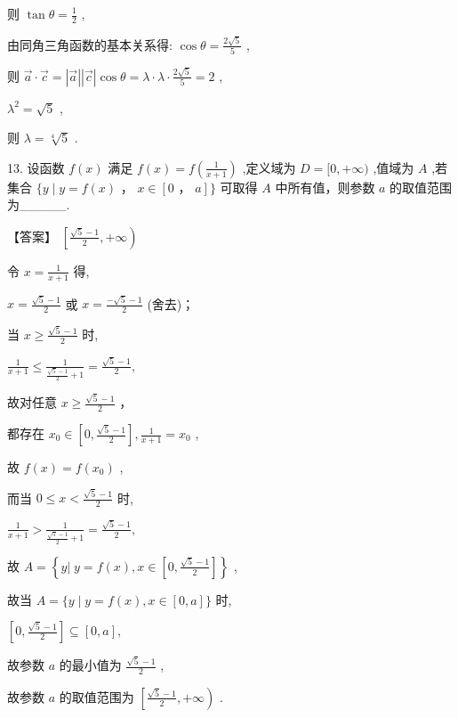 \documentclass[10pt]{article}
\begin{document}
则 \(\tan \theta  = \frac{1}{2}\) ,

由同角三角函数的基本关系得: \(\cos \theta  = \frac{2\sqrt{5}}{5}\) ,

则 \(\overrightarrow{a} \cdot  \overrightarrow{c} = \left| \overrightarrow{a}\right| \left| \overrightarrow{c}\right| \cos \theta  = \lambda  \cdot  \lambda  \cdot  \frac{2\sqrt{5}}{5} = 2\) ,

\({\lambda }^{2} = \sqrt{5}\) ,

则 \(\lambda  = \sqrt[4]{5}\) .

13. 设函数 \(f\left( x\right)\) 满足 \(f\left( x\right)  = f\left( \frac{1}{x + 1}\right)\) ,定义域为 \(D = \lbrack 0, + \infty )\) ,值域为 \(A\) ,若集合 \(\{ y \mid  y = f\left( x\right) \text{ ， }x \in  \left\lbrack  {0\text{ ， }a}\right\rbrack  \}\) 可取得 \(A\) 中所有值，则参数 \(a\) 的取值范围为\_\_\_\_\_.

【答案】 \(\left\lbrack  {\frac{\sqrt{5} - 1}{2}, + \infty }\right)\)

令 \(x = \frac{1}{x + 1}\) 得,

\(x = \frac{\sqrt{5} - 1}{2}\) 或 \(x = \frac{-\sqrt{5} - 1}{2}\) (舍去)；

当 \(x \geq  \frac{\sqrt{5} - 1}{2}\) 时,

\(\frac{1}{x + 1} \leq  \frac{1}{\frac{\sqrt{5} - 1}{2} + 1} = \frac{\sqrt{5} - 1}{2},\)

故对任意 \(x \geq  \frac{\sqrt{5} - 1}{2}\) ，

都存在 \({x}_{0} \in  \left\lbrack  {0,\frac{\sqrt{5} - 1}{2}}\right\rbrack  ,\frac{1}{x + 1} = {x}_{0}\) ,

故 \(f\left( x\right)  = f\left( {x}_{0}\right)\) ,

而当 \(0 \leq  x < \frac{\sqrt{5} - 1}{2}\) 时,

\(\frac{1}{x + 1} > \frac{1}{\frac{\sqrt{5} - 1}{2} + 1} = \frac{\sqrt{5} - 1}{2},\)

故 \(A = \left\{  {y\left| {\;y = f\left( x\right) }\right. ,x \in  \left\lbrack  {0,\frac{\sqrt{5} - 1}{2}}\right\rbrack  }\right\}\) ,

故当 \(A = \{ y \mid  y = f\left( x\right) ,x \in  \left\lbrack  {0,a}\right\rbrack  \}\) 时,

\(\left\lbrack  {0,\frac{\sqrt{5} - 1}{2}}\right\rbrack   \subseteq  \left\lbrack  {0,a}\right\rbrack  ,\)

故参数 \(a\) 的最小值为 \(\frac{\sqrt{5} - 1}{2}\) ,

故参数 \(a\) 的取值范围为 \(\left\lbrack  {\frac{\sqrt{5} - 1}{2}, + \infty }\right)\) .
\end{document}

